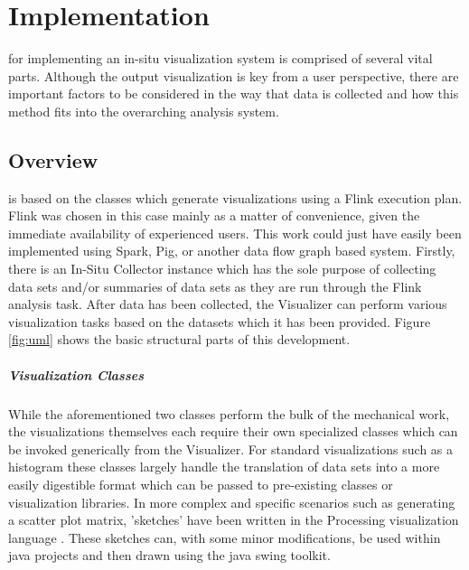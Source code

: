 \chapter{Implementation}
\label{sec:implementation}
 for implementing an in-situ visualization system is comprised of several vital parts. Although the  output visualization is key from a user perspective, there are important factors to be considered in the way that data is collected and how this method fits into the overarching analysis system. 
 
\section{Overview}
\label{sec:overview}
 is based on the classes which generate visualizations using a Flink execution plan. Flink was chosen in this case mainly as a matter of convenience, given the immediate availability of experienced users. This work could just have easily been implemented using Spark, Pig, or another data flow graph based system. Firstly, there is an In-Situ Collector instance which has the sole purpose of collecting data sets and/or summaries of data sets as they are run through the Flink analysis task. After data has been collected, the Visualizer can perform various visualization tasks based on the datasets which it has been provided. Figure \ref{fig:uml} shows the basic structural parts of this development. 

\paragraph{Visualization Classes}
While the aforementioned two classes perform the  bulk of the mechanical work, the visualizations themselves each require their own specialized classes which can be invoked generically from the Visualizer. For standard visualizations such as a histogram these classes largely handle the translation of data sets into a more easily digestible format which can be passed to pre-existing classes or visualization libraries. In more complex and specific scenarios such as generating a scatter plot matrix, 'sketches' have been written in the Processing visualization language \citep{Fry2015}. These sketches can, with some minor modifications, be used within java projects and then drawn using the java swing toolkit. 

